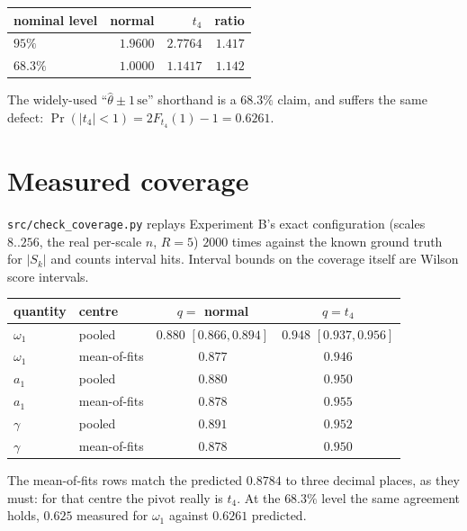 \documentclass[11pt]{article}
\newcommand{\se}{\mathrm{se}}
\begin{document}
\begin{center}
\begin{tabular}{lrrr}
\toprule
nominal level & normal & $t_4$ & ratio\\
\midrule
$95\%$   & $1.9600$ & $2.7764$ & $1.417$\\
$68.3\%$ & $1.0000$ & $1.1417$ & $1.142$\\
\bottomrule
\end{tabular}
\end{center}

\noindent
The widely-used ``$\hat\theta\pm 1\,\se$'' shorthand is a $68.3\%$ claim, and
suffers the same defect:
$\Pr(\lvert t_4\rvert<1)=2F_{t_4}(1)-1=0.6261$.

\section{Measured coverage}

\texttt{src/check\_coverage.py} replays Experiment B's exact configuration
(scales $8..256$, the real per-scale $n$, $R=5$) $2000$ times against the known
ground truth for $\lvert S_k\rvert$ and counts interval hits. Interval bounds on
the coverage itself are Wilson score intervals.

\begin{center}
\begin{tabular}{llcc}
\toprule
quantity & centre & $q=$ normal & $q=t_4$\\
\midrule
$\omega_1$ & pooled       & $0.880$ $[0.866,0.894]$ & $0.948$ $[0.937,0.956]$\\
$\omega_1$ & mean-of-fits & $0.877$                 & $0.946$\\
$a_1$      & pooled       & $0.880$                 & $0.950$\\
$a_1$      & mean-of-fits & $0.878$                 & $0.955$\\
$\gamma$   & pooled       & $0.891$                 & $0.952$\\
$\gamma$   & mean-of-fits & $0.878$                 & $0.950$\\
\bottomrule
\end{tabular}
\end{center}

\noindent
The mean-of-fits rows match the predicted $0.8784$ to three decimal places, as
they must: for that centre the pivot really is $t_4$. At the $68.3\%$ level the
same agreement holds, $0.625$ measured for $\omega_1$ against $0.6261$
predicted.
\end{document}
